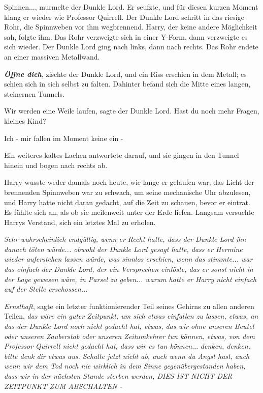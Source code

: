 \glqq{}Spinnen...\grqq{}, murmelte der Dunkle Lord. Er seufzte, und für diesen
kurzen Moment klang er wieder wie Professor Quirrell. Der Dunkle Lord schritt in
das riesige Rohr, die Spinnweben vor ihm wegbrennend. Harry, der keine andere
Möglichkeit sah, folgte ihm. Das Rohr verzweigte sich in einer Y-Form, dann
verzweigte es sich wieder. Der Dunkle Lord ging nach links, dann nach rechts.
Das Rohr endete an einer massiven Metallwand.

\glqq{}\textbf{\emph{Öffne dich}}\grqq{}, zischte der Dunkle Lord, und ein Riss
erschien in dem Metall; es schien sich in sich selbst zu falten. Dahinter befand
sich die Mitte eines langen, steinernen Tunnels.

\glqq{}Wir werden eine Weile laufen\grqq{}, sagte der Dunkle Lord. \glqq{}Hast du
noch mehr Fragen, kleines Kind?\grqq{}

\glqq{}Ich - mir fallen im Moment keine ein -\grqq{}

Ein weiteres kaltes Lachen antwortete darauf, und sie gingen in den Tunnel
hinein und bogen nach rechts ab.

Harry wusste weder damals noch heute, wie lange er gelaufen war; das Licht der
brennenden Spinnweben war zu schwach, um seine mechanische Uhr abzulesen, und
Harry hatte nicht daran gedacht, auf die Zeit zu schauen, bevor er eintrat. Es
fühlte sich an, als ob sie meilenweit unter der Erde liefen. Langsam versuchte
Harrys Verstand, sich ein letztes Mal zu erholen.

\emph{Sehr wahrscheinlich endgültig, wenn er Recht hatte, dass der Dunkle Lord
ihn danach töten würde... obwohl der Dunkle Lord gesagt hatte, dass er Hermine
wieder auferstehen lassen würde, was sinnlos erschien, wenn das stimmte... war
das einfach der Dunkle Lord, der ein Versprechen einlöste, das er sonst nicht in
der Lage gewesen wäre, in Parsel zu geben... warum hatte er Harry nicht einfach
auf der Stelle erschossen...}

\emph{Ernsthaft}, sagte ein letzter funktionierender Teil seines Gehirns zu
allen anderen Teilen, \emph{das wäre ein guter Zeitpunkt, um sich etwas
einfallen zu lassen, etwas, an das der Dunkle Lord noch nicht gedacht hat,
etwas, das wir ohne unseren Beutel oder unseren Zauberstab oder unseren
Zeitumkehrer tun können, etwas, von dem Professor Quirrell nicht gedacht hat,
dass wir es tun können.}..\emph{ denken, denken, bitte denk dir etwas aus.
Schalte jetzt nicht ab, auch wenn du Angst hast, auch wenn wir dem Tod noch nie
wirklich in dem Sinne gegenübergestanden haben, dass wir in der nächsten Stunde
sterben werden, DIES IST NICHT DER ZEITPUNKT ZUM ABSCHALTEN -}

